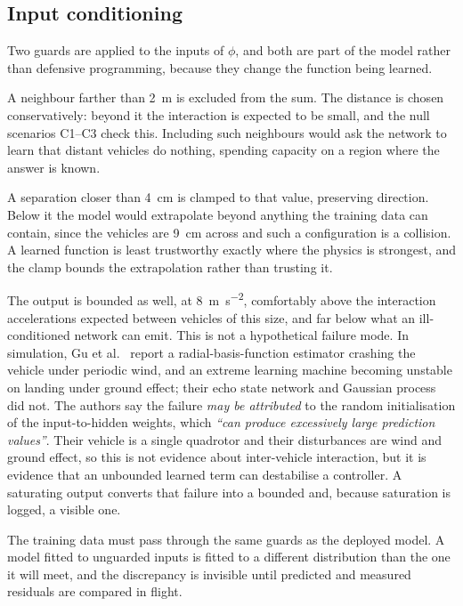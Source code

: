 \subsection{Input conditioning}
\label{sec:model-guards}

Two guards are applied to the inputs of $\phi$, and both are part of the model rather than
defensive programming, because they change the function being learned.

A neighbour farther than \SI{2}{\metre} is excluded from the sum. The distance is chosen
conservatively: beyond it the interaction is expected to be small, and the null scenarios C1--C3
check this. Including such neighbours would ask the network to learn that distant vehicles do
nothing, spending capacity on a region where the answer is known.

A separation closer than \SI{4}{\centi\metre} is clamped to that value, preserving direction. Below
it the model would extrapolate beyond anything the training data can contain, since the vehicles are
\SI{9}{\centi\metre} across and such a configuration is a collision. A learned function is least
trustworthy exactly where the physics is strongest, and the clamp bounds the extrapolation rather
than trusting it.

The output is bounded as well, at \SI{8}{\metre\per\second\squared}, comfortably above the
interaction accelerations expected between vehicles of this size, and far below what an
ill-conditioned network can emit. This is not a hypothetical failure mode. In simulation, Gu et
al.~\cite{gu2025comparative} report a radial-basis-function estimator crashing the vehicle under
periodic wind, and an extreme learning machine becoming unstable on landing under ground effect;
their echo state network and Gaussian process did not. The authors say the failure \emph{may be
attributed} to the random initialisation of the input-to-hidden weights, which \emph{``can produce
excessively large prediction values''}. Their vehicle is a single quadrotor and their disturbances
are wind and ground effect, so this is not evidence about inter-vehicle interaction, but it is
evidence that an unbounded learned term can destabilise a controller. A saturating output converts
that failure into a bounded and, because saturation is logged, a visible one.

The training data must pass through the same guards as the deployed model. A model fitted to
unguarded inputs is fitted to a different distribution than the one it will meet, and the
discrepancy is invisible until predicted and measured residuals are compared in flight.

